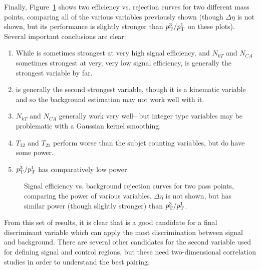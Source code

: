 
Finally, Figure~\ref{fig:search:search:optimization:All} shows two efficiency vs. rejection curves for two different mass points, comparing all of the various variables previously shown (though $\Delta \eta$ is not shown, but its performance is slightly stronger than $p_{\text{T}}^3/p_{\text{T}}^1$ on these plots). Several important conclusions are clear:

\begin{enumerate}
\item While \Ht is sometimes strongest at very high signal efficiency, and $N_{kT}$ and $N_{CA}$ sometimes strongest at very, very low signal efficiency, \MJ is generally the strongest variable by far.
\item \Ht is generally the second strongest variable, though it is a kinematic variable and so the background estimation may not work well with it.
\item $N_{kT}$ and $N_{CA}$ generally work very well-- but integer type variables may be problematic with a Gaussian kernel smoothing.
\item $T_{32}$ and $T_{21}$ perform worse than the subjet counting variables, but do have some power.
\item $p_{\text{T}}^3/p_{\text{T}}^1$ has comparatively low power.
\end{enumerate}


\begin{figure}
\centering
{}
\label{fig:search:search:optimization:All}
\caption{Signal efficiency vs. background rejection curves for two pass points, comparing the power of various variables. $\Delta \eta$ is not shown, but has similar power (though slightly stronger) than $p_{\text{T}}^3 / p_{\text{T}}^1$.}
\end{figure}


From this set of results, it is clear that \MJ is a good candidate for a final discriminant variable which can apply the most discrimination between signal and background. There are several other candidates for the second variable used for defining signal and control regions, but these need two-dimensional correlation studies in order to understand the best pairing.

